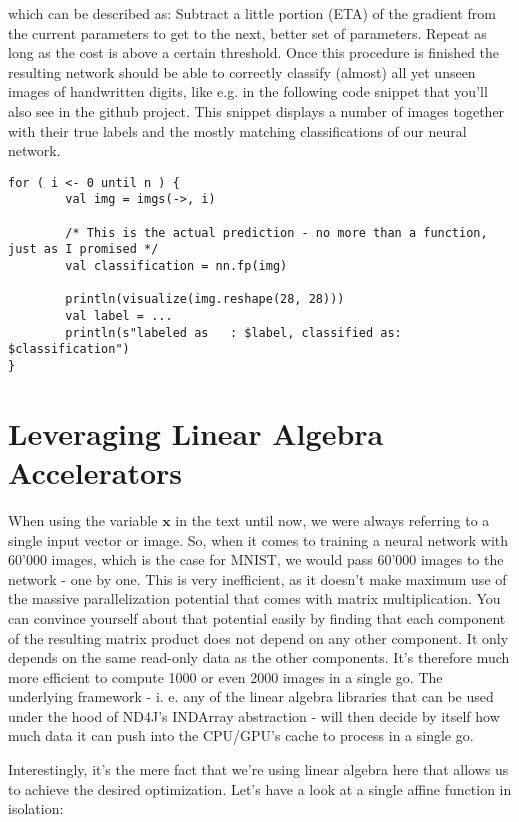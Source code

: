 \documentclass[]{report}
\begin{document}
which can be described as: Subtract a little portion (ETA) of the gradient from the current parameters to get to the next, better set of parameters. Repeat as long as the cost is above a certain threshold. Once this procedure is finished the resulting network should be able to correctly classify (almost) all yet unseen images of handwritten digits, like e.g. in the following code snippet that you'll also see in the github project. This snippet displays a number of images together with their true labels and the mostly matching classifications of our neural network. 

\begin{lstlisting}
for ( i <- 0 until n ) {
		val img = imgs(->, i)

		/* This is the actual prediction - no more than a function, just as I promised */
		val classification = nn.fp(img)

		println(visualize(img.reshape(28, 28)))
		val label = ...
		println(s"labeled as   : $label, classified as: $classification")
}
\end{lstlisting}

\section{Leveraging Linear Algebra Accelerators}\label{accelerators}


When using the variable \(\mathbf{x}\) in the text until now, we were always referring to a single input vector or image. So, when it comes to training a neural network with 60'000 images, which is the case for MNIST, we would pass 60'000 images to the network - one by one. This is very inefficient, as it doesn't make maximum use of the massive parallelization potential that comes with matrix multiplication. You can convince yourself about that potential easily by finding that each component of the resulting matrix product does not depend on any other component. It only depends on the same read-only data as the other components. It's therefore much more efficient to compute 1000 or even 2000 images in a single go. The underlying framework - i. e. any of the linear algebra libraries that can be used under the hood of ND4J's INDArray abstraction - will then decide by itself how much data it can push into the CPU/GPU's cache to process in a single go. 

Interestingly, it's the mere fact that we're using linear algebra here that allows us to achieve the desired optimization. Let's have a look at a single affine function in isolation:
\end{document}
